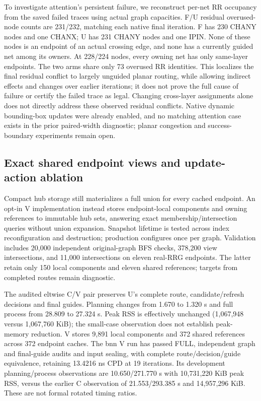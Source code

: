 \documentclass[conference,10pt]{IEEEtran}
\begin{document}
To investigate attention's persistent failure, we reconstruct per-net RR occupancy from the saved failed traces using actual graph capacities. F/U residual overused-node counts are 231/232, matching each native final iteration. F has 230 CHANY nodes and one CHANX; U has 231 CHANY nodes and one IPIN. None of these nodes is an endpoint of an actual crossing edge, and none has a currently guided net among its owners. At 228/224 nodes, every owning net has only same-layer endpoints. The two arms share only 73 overused RR identities. This localizes the final residual conflict to largely unguided planar routing, while allowing indirect effects and changes over earlier iterations; it does not prove the full cause of failure or certify the failed trace as legal. Changing cross-layer assignments alone does not directly address these observed residual conflicts. Native dynamic bounding-box updates were already enabled, and no matching attention case exists in the prior paired-width diagnostic; planar congestion and success-boundary experiments remain open.


\subsection{Exact shared endpoint views and update-action ablation}
Compact hub storage still materializes a full union for every cached endpoint. An opt-in V implementation instead stores endpoint-local components and owning references to immutable hub sets, answering exact membership/intersection queries without union expansion. Snapshot lifetime is tested across index reconfiguration and destruction; production configures once per graph. Validation includes 20,000 independent original-graph BFS checks, 378,200 view intersections, and 11,000 intersections on eleven real-RRG endpoints. The latter retain only 150 local components and eleven shared references; targets from completed routes remain diagnostic.

The audited eltwise C/V pair preserves U's complete route, candidate/refresh decisions and final guides. Planning changes from 1.670 to 1.320 s and full process from 28.809 to 27.324 s. Peak RSS is effectively unchanged (1,067,948 versus 1,067,760 KiB); the small-case observation does not establish peak-memory reduction. V stores 9,891 local components and 372 shared references across 372 endpoint caches. The bnn V run has passed FULL, independent graph and final-guide audits and input sealing, with complete route/decision/guide equivalence, retaining 13.4216 ns CPD at 19 iterations. Its development planning/process observations are 10.650/271.770 s with 10,731,220 KiB peak RSS, versus the earlier C observation of 21.553/293.385 s and 14,957,296 KiB. These are not formal rotated timing ratios.
\end{document}
